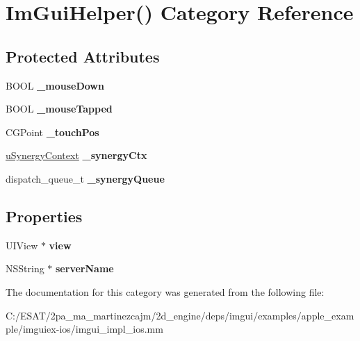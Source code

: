 \hypertarget{category_im_gui_helper_07_08}{}\section{Im\+Gui\+Helper() Category Reference}
\label{category_im_gui_helper_07_08}
\subsection*{Protected Attributes}
\begin{DoxyCompactItemize}
\item 
\mbox{\label{category_im_gui_helper_07_08_a0683b2894504cbf84b595c716be72a0a}} 
B\+O\+OL {\bfseries \+\_\+mouse\+Down}
\item 
\mbox{\label{category_im_gui_helper_07_08_ae6fb397ca1444f13360fe459eeb00f83}} 
B\+O\+OL {\bfseries \+\_\+mouse\+Tapped}
\item 
\mbox{\label{category_im_gui_helper_07_08_a508e3d326dd4b3fe7a817a0742a42502}} 
C\+G\+Point {\bfseries \+\_\+touch\+Pos}
\item 
\mbox{\label{category_im_gui_helper_07_08_ab7ad9835c74c61f385eb0040acfe8414}} 
\hyperlink{structu_synergy_context}{u\+Synergy\+Context} {\bfseries \+\_\+synergy\+Ctx}
\item 
\mbox{\label{category_im_gui_helper_07_08_a3174c5ed2f2ce0c3606a0603bce463f7}} 
dispatch\+\_\+queue\+\_\+t {\bfseries \+\_\+synergy\+Queue}
\end{DoxyCompactItemize}
\subsection*{Properties}
\begin{DoxyCompactItemize}
\item 
\mbox{\label{category_im_gui_helper_07_08_a4f43934107f6078664cc01874a36de0a}} 
U\+I\+View $\ast$ {\bfseries view}
\item 
\mbox{\label{category_im_gui_helper_07_08_a0926fe22e1b5841d34ac665abb49cd2a}} 
N\+S\+String $\ast$ {\bfseries server\+Name}
\end{DoxyCompactItemize}


The documentation for this category was generated from the following file\+:\begin{DoxyCompactItemize}
\item 
C\+:/\+E\+S\+A\+T/2pa\+\_\+ma\+\_\+martinezcajm/2d\+\_\+engine/deps/imgui/examples/apple\+\_\+example/imguiex-\/ios/imgui\+\_\+impl\+\_\+ios.\+mm\end{DoxyCompactItemize}
